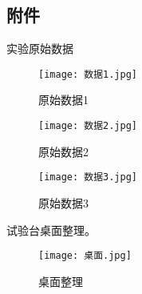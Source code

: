 \documentclass[dvipsnames, svgnames,a4paper,11pt]{article}
\begin{document}
	
	
	\subsection{附件}
	实验原始数据
	\begin{figure}[H]
		\begin{minipage}[b]{0.25\linewidth}
		  \centering
		  \texttt{[image: 数据1.jpg]}
		  \caption{原始数据1}
		\end{minipage}
		\hfill
		\begin{minipage}[b]{0.25\linewidth}
		  \centering
		  \texttt{[image: 数据2.jpg]}
		  \caption{原始数据2}
		\end{minipage}
		\hfill
		\begin{minipage}[b]{0.25\linewidth}
		  \centering
		  \texttt{[image: 数据3.jpg]}
		  \caption{原始数据3}
		\end{minipage}
	\end{figure}
	试验台桌面整理。
	\begin{figure}[H]
		\centering
		\texttt{[image: 桌面.jpg]}
		\caption{桌面整理}
		\label{}
	\end{figure}
	

	
	
	
	
\end{document}
